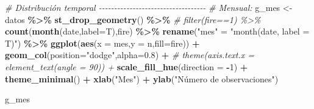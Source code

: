 \documentclass[12pt,a4paper,]{book}
\newenvironment{Shaded}{\begin{snugshade}}{\end{snugshade}}
\newcommand{\AttributeTok}[1]{\textcolor[rgb]{0.13,0.29,0.53}{#1}}
\newcommand{\CommentTok}[1]{\textcolor[rgb]{0.56,0.35,0.01}{\textit{#1}}}
\newcommand{\DecValTok}[1]{\textcolor[rgb]{0.00,0.00,0.81}{#1}}
\newcommand{\FloatTok}[1]{\textcolor[rgb]{0.00,0.00,0.81}{#1}}
\newcommand{\FunctionTok}[1]{\textcolor[rgb]{0.13,0.29,0.53}{\textbf{#1}}}
\newcommand{\NormalTok}[1]{#1}
\newcommand{\OtherTok}[1]{\textcolor[rgb]{0.56,0.35,0.01}{#1}}
\newcommand{\SpecialCharTok}[1]{\textcolor[rgb]{0.81,0.36,0.00}{\textbf{#1}}}
\newcommand{\StringTok}[1]{\textcolor[rgb]{0.31,0.60,0.02}{#1}}
\numberwithin{dummy}{section}
\theoremstyle{ocrenumbox}
\theoremstyle{blacknumex}
\theoremstyle{blacknumbox}
\theoremstyle{ocrenum}
\theoremstyle{ocrenum}
\begin{document}
\begin{Shaded}
\begin{Highlighting}[]
\CommentTok{\# Distribución temporal {-}{-}{-}{-}{-}{-}{-}{-}{-}{-}{-}{-}{-}{-}{-}{-}{-}{-}{-}{-}{-}{-}{-}{-}{-}{-}{-}{-}{-}{-}{-}{-}{-}{-}{-}}
\CommentTok{\# Mensual:}
\NormalTok{g\_mes }\OtherTok{\textless{}{-}}\NormalTok{ datos }\SpecialCharTok{\%\textgreater{}\%} 
  \FunctionTok{st\_drop\_geometry}\NormalTok{() }\SpecialCharTok{\%\textgreater{}\%} 
  \CommentTok{\# filter(fire==1) \%\textgreater{}\% }
  \FunctionTok{count}\NormalTok{(}\FunctionTok{month}\NormalTok{(date,}\AttributeTok{label=}\NormalTok{T),fire) }\SpecialCharTok{\%\textgreater{}\%} 
  \FunctionTok{rename}\NormalTok{(}\StringTok{"mes"} \OtherTok{=} \StringTok{"month(date, label = T)"}\NormalTok{) }\SpecialCharTok{\%\textgreater{}\%} 
  \FunctionTok{ggplot}\NormalTok{(}\FunctionTok{aes}\NormalTok{(}\AttributeTok{x =}\NormalTok{ mes,}\AttributeTok{y =}\NormalTok{ n,}\AttributeTok{fill=}\NormalTok{fire)) }\SpecialCharTok{+}
  \FunctionTok{geom\_col}\NormalTok{(}\AttributeTok{position=}\StringTok{"dodge"}\NormalTok{,}\AttributeTok{alpha=}\FloatTok{0.8}\NormalTok{) }\SpecialCharTok{+}
  \CommentTok{\# theme(axis.text.x = element\_text(angle = 90)) +}
  \FunctionTok{scale\_fill\_hue}\NormalTok{(}\AttributeTok{direction =} \SpecialCharTok{{-}}\DecValTok{1}\NormalTok{) }\SpecialCharTok{+}
  \FunctionTok{theme\_minimal}\NormalTok{() }\SpecialCharTok{+}
  \FunctionTok{xlab}\NormalTok{(}\StringTok{"Mes"}\NormalTok{) }\SpecialCharTok{+}
  \FunctionTok{ylab}\NormalTok{(}\StringTok{"Número de observaciones"}\NormalTok{)}

\NormalTok{g\_mes}


\end{Highlighting}
\end{Shaded}
\end{document}
